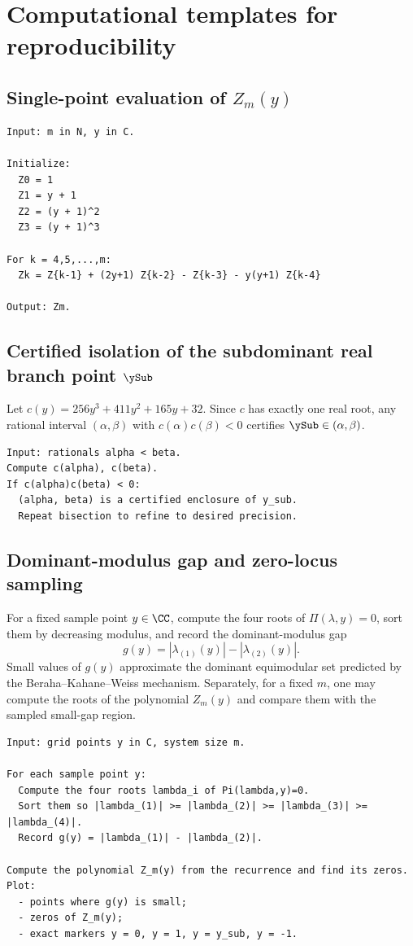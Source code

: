 \section{Computational templates for reproducibility}\label{app:pseudocode}

\subsection{Single-point evaluation of \texorpdfstring{\(Z_m(y)\)}{Z\_m(y)}}

\begin{verbatim}
Input: m in N, y in C.

Initialize:
  Z0 = 1
  Z1 = y + 1
  Z2 = (y + 1)^2
  Z3 = (y + 1)^3

For k = 4,5,...,m:
  Zk = Z{k-1} + (2y+1) Z{k-2} - Z{k-3} - y(y+1) Z{k-4}

Output: Zm.
\end{verbatim}

\subsection{Certified isolation of the subdominant real branch point \texorpdfstring{\(\ySub\)}{ySub}}

Let \(c(y)=256y^3+411y^2+165y+32\). Since \(c\) has exactly one real root, any rational interval \((\alpha,\beta)\) with
\(c(\alpha)c(\beta)<0\) certifies \(\ySub\in(\alpha,\beta)\).

\begin{verbatim}
Input: rationals alpha < beta.
Compute c(alpha), c(beta).
If c(alpha)c(beta) < 0:
  (alpha, beta) is a certified enclosure of y_sub.
  Repeat bisection to refine to desired precision.
\end{verbatim}

\subsection{Dominant-modulus gap and zero-locus sampling}

For a fixed sample point \(y\in\CC\), compute the four roots of \(\Pi(\lambda,y)=0\),
sort them by decreasing modulus,
and record the dominant-modulus gap
\[
g(y)=|\lambda_{(1)}(y)|-|\lambda_{(2)}(y)|.
\]
Small values of \(g(y)\) approximate the dominant equimodular set predicted by the Beraha--Kahane--Weiss mechanism.
Separately, for a fixed \(m\), one may compute the roots of the polynomial \(Z_m(y)\) and compare them with the sampled small-gap region.

\begin{verbatim}
Input: grid points y in C, system size m.

For each sample point y:
  Compute the four roots lambda_i of Pi(lambda,y)=0.
  Sort them so |lambda_(1)| >= |lambda_(2)| >= |lambda_(3)| >= |lambda_(4)|.
  Record g(y) = |lambda_(1)| - |lambda_(2)|.

Compute the polynomial Z_m(y) from the recurrence and find its zeros.
Plot:
  - points where g(y) is small;
  - zeros of Z_m(y);
  - exact markers y = 0, y = 1, y = y_sub, y = -1.
\end{verbatim}

